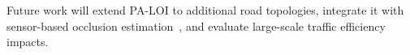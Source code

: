\documentclass[conference]{IEEEtran}
\begin{document}
Future work will extend PA-LOI to additional road topologies, integrate it with sensor-based occlusion estimation~\cite{blindspot2024,occtrack2025}, and evaluate large-scale traffic efficiency impacts.



\end{document}
